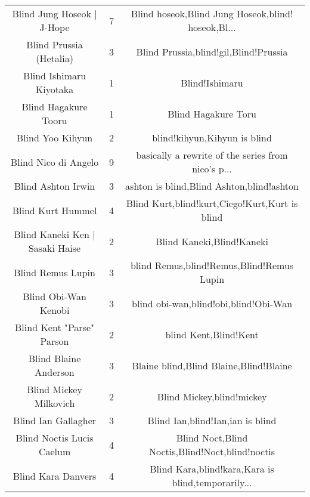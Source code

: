 \begin{table}[h!]
{\begin{tabular}{|c|c|c|}
                        Blind Jung Hoseok | J-Hope &      7 & Blind hoseok,Blind Jung Hoseok,blind! hoseok,Bl... \\
                           Blind Prussia (Hetalia) &      3 &              Blind Prussia,blind!gil,Blind!Prussia \\
                           Blind Ishimaru Kiyotaka &      1 &                                     Blind!Ishimaru \\
                              Blind Hagakure Tooru &      1 &                                Blind Hagakure Toru \\
                                  Blind Yoo Kihyun &      2 &                       blind!kihyun,Kihyun is blind \\
                              Blind Nico di Angelo &      9 & basically a rewrite of the series from nico's p... \\
                                Blind Ashton Irwin &      3 &          ashton is blind,Blind Ashton,blind!ashton \\
                                 Blind Kurt Hummel &      4 &     Blind Kurt,blind!kurt,Ciego!Kurt,Kurt is blind \\
                   Blind Kaneki Ken | Sasaki Haise &      2 &                          Blind Kaneki,Blind!Kaneki \\
                                 Blind Remus Lupin &      3 &          blind Remus,blind!Remus,Blind!Remus Lupin \\
                              Blind Obi-Wan Kenobi &      3 &              blind obi-wan,blind!obi,blind!Obi-Wan \\
                         Blind Kent "Parse" Parson &      2 &                              blind Kent,Blind!Kent \\
                             Blind Blaine Anderson &      3 &             Blaine blind,Blind Blaine,Blind!Blaine \\
                            Blind Mickey Milkovich &      2 &                          Blind Mickey,blind!mickey \\
                               Blind Ian Gallagher &      3 &                   Blind Ian,blind!Ian,ian is blind \\
                         Blind Noctis Lucis Caelum &      4 &    Blind Noct,Blind Noctis,Blind!Noct,blind!noctis \\
                                Blind Kara Danvers &      4 & Blind Kara,blind!kara,Kara is blind,temporarily... \\

\end{tabular}}
\end{table}

